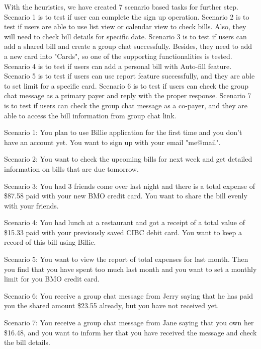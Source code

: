 \documentclass{sigchi}
\begin{document}
With the heuristics, we have created 7 scenario based tasks for further step. Scenario 1 is to test if user can complete the sign up operation. Scenario 2 is to test if users are able to use list view or calendar view to check bills. Also, they will need to check bill details for specific date. Scenario 3 is to test if users can add a shared bill and create a group chat successfully. Besides, they need to add a new card into "Cards", so one of the supporting functionalities is tested. Scenario 4 is to test if users can add a personal bill with Auto-fill feature. Scenario 5 is to test if users can use report feature successfully, and they are able to set limit for a specific card. Scenario 6 is to test if users can check the group chat message as a primary payer and reply with the proper response. Scenario 7 is to test if users can check the group chat message as a co-payer, and they are able to access the bill information from group chat link. 

Scenario 1: You plan to use Billie application for the first time and you don't have an account yet. You want to sign up with your email "me@mail". 

Scenario 2: You want to check the upcoming bills for next week and get detailed information on bills that are due tomorrow. 

Scenario 3: You had 3 friends come over last night and there is a total expense of \$87.58 paid with your new BMO credit card. You want to share the bill evenly with your friends. 

Scenario 4: You had lunch at a restaurant and got a receipt of a total value of \$15.33 paid with your previously saved CIBC debit card. You want to keep a record of this bill using Billie.

Scenario 5: You want to view the report of total expenses for last month. Then you find that you have spent too much last month and you want to set a monthly limit for you BMO credit card.

Scenario 6: You receive a group chat message from Jerry saying that he has paid you the shared amount \$23.55 already, but you have not received yet. 

Scenario 7: You receive a group chat message from Jane saying that you own her \$16.48, and you want to inform her that you have received the message and check the bill details.
\end{document}
